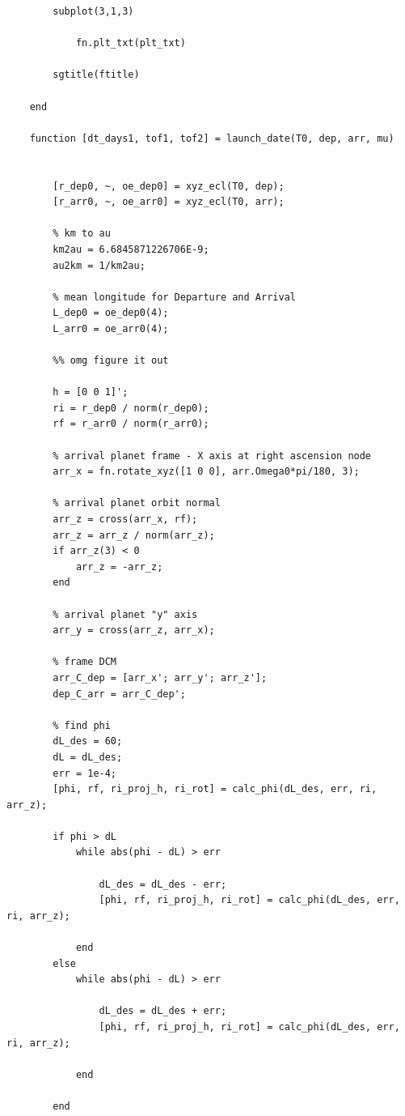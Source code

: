 \documentclass[conf]{new-aiaa}
\begin{document}
\begin{lstlisting}
        subplot(3,1,3) 
        
            fn.plt_txt(plt_txt) 
    
        sgtitle(ftitle)
    
    end 
    
    function [dt_days1, tof1, tof2] = launch_date(T0, dep, arr, mu)
    
    
        [r_dep0, ~, oe_dep0] = xyz_ecl(T0, dep); 
        [r_arr0, ~, oe_arr0] = xyz_ecl(T0, arr); 
    
        % km to au 
        km2au = 6.6845871226706E-9; 
        au2km = 1/km2au; 
    
        % mean longitude for Departure and Arrival
        L_dep0 = oe_dep0(4); 
        L_arr0 = oe_arr0(4); 
        
        %% omg figure it out 
        
        h = [0 0 1]'; 
        ri = r_dep0 / norm(r_dep0);     
        rf = r_arr0 / norm(r_arr0);
        
        % arrival planet frame - X axis at right ascension node 
        arr_x = fn.rotate_xyz([1 0 0], arr.Omega0*pi/180, 3); 
    
        % arrival planet orbit normal 
        arr_z = cross(arr_x, rf); 
        arr_z = arr_z / norm(arr_z); 
        if arr_z(3) < 0 
            arr_z = -arr_z; 
        end 
        
        % arrival planet "y" axis 
        arr_y = cross(arr_z, arr_x); 
        
        % frame DCM 
        arr_C_dep = [arr_x'; arr_y'; arr_z']; 
        dep_C_arr = arr_C_dep'; 
            
        % find phi 
        dL_des = 60; 
        dL = dL_des; 
        err = 1e-4; 
        [phi, rf, ri_proj_h, ri_rot] = calc_phi(dL_des, err, ri, arr_z); 
        
        if phi > dL
            while abs(phi - dL) > err 
    
                dL_des = dL_des - err; 
                [phi, rf, ri_proj_h, ri_rot] = calc_phi(dL_des, err, ri, arr_z); 
    
            end 
        else
            while abs(phi - dL) > err 
    
                dL_des = dL_des + err; 
                [phi, rf, ri_proj_h, ri_rot] = calc_phi(dL_des, err, ri, arr_z); 
    
            end 
            
        end 
        

\end{lstlisting}
\end{document}
